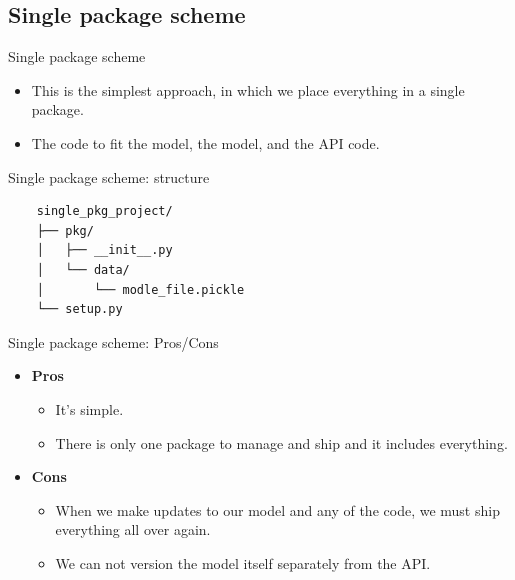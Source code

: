 \documentclass[10pt]{beamer}
\begin{document}
\subsection{Single package scheme}

\begin{frame}[fragile]{Single package scheme}

  \begin{itemize}
    \item This is the simplest approach, in which we place everything in a single package.
    \item The code to fit the model, the model, and the API code.
   \end{itemize}

\end{frame}

\begin{frame}[fragile]{Single package scheme: structure}

  \begin{verbatim}
    single_pkg_project/
    ├── pkg/
    │   ├── __init__.py
    │   └── data/
    │       └── modle_file.pickle
    └── setup.py
  \end{verbatim}

\end{frame}




\begin{frame}[fragile]{Single package scheme: Pros/Cons}

  \begin{itemize}
    \item \textbf{Pros}
      \begin{itemize}
        \item It's simple.
        \item There is only one package to manage and ship and it includes everything.
      \end{itemize}

    \item \textbf{Cons}
      \begin{itemize}
        \item When we make updates to our model and any of the code, we must ship everything all over again.
        \item We can not version the model itself separately from the API.
      \end{itemize}
  \end{itemize}

\end{frame}
\end{document}
